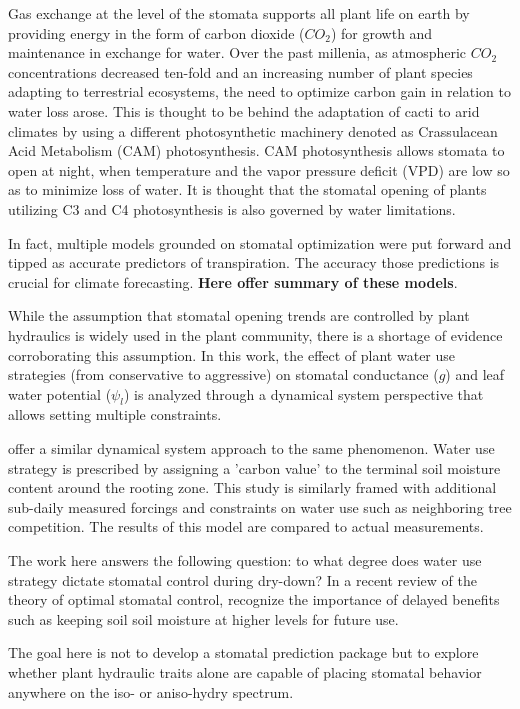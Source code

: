\documentclass[utf8]{frontiersSCNS} %
\begin{document}
Gas exchange at the level of the stomata supports all plant life on earth by providing energy in the form of carbon dioxide ($CO_2$) for growth and maintenance in exchange for water. Over the past millenia, as atmospheric $CO_2$ concentrations decreased ten-fold and an increasing number of plant species adapting to terrestrial ecosystems, the need to optimize carbon gain in relation to water loss arose. This is thought to be behind the adaptation of cacti to arid climates by using a different photosynthetic machinery denoted as Crassulacean Acid Metabolism (CAM) photosynthesis. CAM photosynthesis allows stomata to open at night, when temperature and the vapor pressure deficit (VPD) are low so as to minimize loss of water. It is thought that the stomatal opening of plants utilizing C3 and C4 photosynthesis is also governed by water limitations.

In fact, multiple models grounded on stomatal optimization were put forward and tipped as accurate predictors of transpiration. The accuracy those predictions is crucial for climate forecasting. \textbf{Here offer summary of these models}.

While the assumption that stomatal opening trends are controlled by plant hydraulics is widely used in the plant community, there is a shortage of evidence corroborating this assumption. In this work, the effect of plant water use strategies (from conservative to aggressive) on stomatal conductance ($g$) and leaf water potential ($\psi_l$) is analyzed through a dynamical system perspective that allows setting multiple constraints. 

\citet{Manzoni2013} offer a similar dynamical system approach to the same phenomenon. Water use strategy is prescribed by assigning a 'carbon value' to the terminal soil moisture content around the rooting zone. This study is similarly framed with additional sub-daily measured forcings and constraints on water use such as neighboring tree competition. The results of this model are compared to actual measurements.

The work here answers the following question: to what degree does water use strategy dictate stomatal control during dry-down? In a recent review of the theory of optimal stomatal control, \citet{Buckley2017} recognize the importance of delayed benefits such as keeping soil soil moisture at higher levels for future use. 

The goal here is not to develop a stomatal prediction package but to explore whether plant hydraulic traits alone are capable of placing stomatal behavior anywhere on the iso- or aniso-hydry spectrum. 
\end{document}
